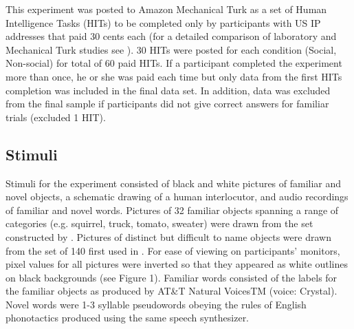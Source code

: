 \documentclass[10pt,letterpaper]{article}
\begin{document}
This experiment was posted to Amazon Mechanical Turk as a set of
Human Intelligence Tasks (HITs) to be completed only by participants with US IP
addresses that paid 30 cents each (for a detailed comparison of laboratory and Mechanical
Turk studies see ). 30 HITs were posted for each
condition (Social, Non-social) for total of 60 paid HITs. If a participant
completed the experiment more than once, he or she was paid each time but only data
from the first HITs completion was included in the final data set. In
addition, data was excluded from the final sample if participants did not give correct
answers for familiar trials (excluded 1 HIT).

\subsection{Stimuli}

Stimuli for the experiment consisted of black and white pictures of familiar
and novel objects, a schematic drawing of a human interlocutor, and audio recordings of familiar and novel words. Pictures of 32 familiar objects spanning a range of categories (e.g. squirrel, truck, tomato, sweater) were drawn from the set constructed by . Pictures of distinct but
difficult to name objects were drawn from the set of 140 first used in . For ease of viewing on participants' monitors, pixel values for all pictures were inverted so that they appeared as white outlines on black backgrounds (see Figure 1). Familiar words consisted of the labels for the familiar objects as produced by AT&T Natural VoicesTM (voice: Crystal). Novel words were 1-3 syllable pseudowords obeying the rules of English phonotactics produced using the same speech synthesizer.
\end{document}
